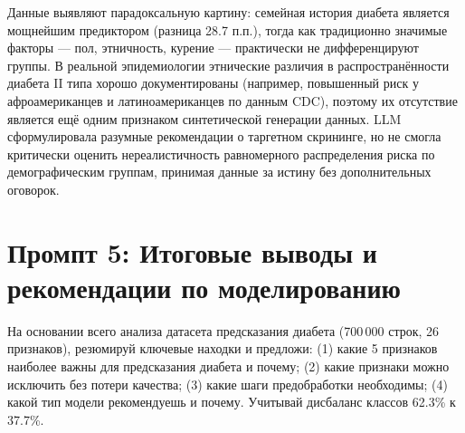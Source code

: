 \documentclass[12pt, a4paper]{article}
\begin{document}
\begin{commentbox}
Данные выявляют парадоксальную картину: семейная история диабета является мощнейшим предиктором (разница 28.7 п.п.), тогда как традиционно значимые факторы --- пол, этничность, курение --- практически не дифференцируют группы. В реальной эпидемиологии этнические различия в распространённости диабета II типа хорошо документированы (например, повышенный риск у афроамериканцев и латиноамериканцев по данным CDC), поэтому их отсутствие является ещё одним признаком синтетической генерации данных. LLM сформулировала разумные рекомендации о таргетном скрининге, но не смогла критически оценить нереалистичность равномерного распределения риска по демографическим группам, принимая данные за истину без дополнительных оговорок.
\end{commentbox}

\section{Промпт 5: Итоговые выводы и рекомендации по моделированию}

\begin{promptbox}
На основании всего анализа датасета предсказания диабета (700\,000 строк, 26 признаков), резюмируй ключевые находки и предложи: (1) какие 5 признаков наиболее важны для предсказания диабета и почему; (2) какие признаки можно исключить без потери качества; (3) какие шаги предобработки необходимы; (4) какой тип модели рекомендуешь и почему. Учитывай дисбаланс классов 62.3\% к 37.7\%.
\end{promptbox}
\end{document}
